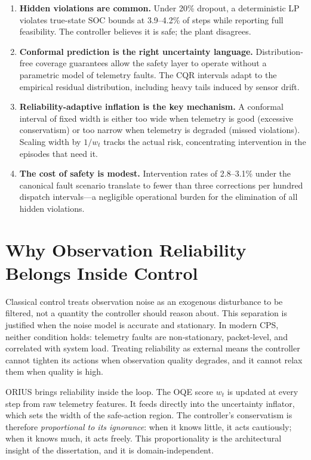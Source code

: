 \begin{enumerate}
  \item \textbf{Hidden violations are common.}  Under 20\% dropout, a
    deterministic LP violates true-state SOC bounds at 3.9--4.2\% of
    steps while reporting full feasibility.  The controller believes it
    is safe; the plant disagrees.
  \item \textbf{Conformal prediction is the right uncertainty language.}
    Distribution-free coverage guarantees allow the safety layer to operate
    without a parametric model of telemetry faults.  The CQR intervals
    adapt to the empirical residual distribution, including heavy tails
    induced by sensor drift.
  \item \textbf{Reliability-adaptive inflation is the key mechanism.}
    A conformal interval of fixed width is either too wide when telemetry
    is good (excessive conservatism) or too narrow when telemetry is
    degraded (missed violations).  Scaling width by $1/w_t$ tracks the
    actual risk, concentrating intervention in the episodes that need it.
  \item \textbf{The cost of safety is modest.}  Intervention rates of
    2.8--3.1\% under the canonical fault scenario translate to fewer than
    three corrections per hundred dispatch intervals---a negligible
    operational burden for the elimination of all hidden violations.
\end{enumerate}

\section{Why Observation Reliability Belongs Inside Control}

Classical control treats observation noise as an exogenous disturbance to
be filtered, not a quantity the controller should reason about.  This
separation is justified when the noise model is accurate and stationary.
In modern CPS, neither condition holds: telemetry faults are non-stationary,
packet-level, and correlated with system load.  Treating reliability as
external means the controller cannot tighten its actions when observation
quality degrades, and it cannot relax them when quality is high.

ORIUS brings reliability inside the loop.  The OQE score $w_t$ is updated
at every step from raw telemetry features.  It feeds directly into the
uncertainty inflator, which sets the width of the safe-action region.  The
controller's conservatism is therefore \emph{proportional to its ignorance}:
when it knows little, it acts cautiously; when it knows much, it acts
freely.  This proportionality is the architectural insight of the
dissertation, and it is domain-independent.

